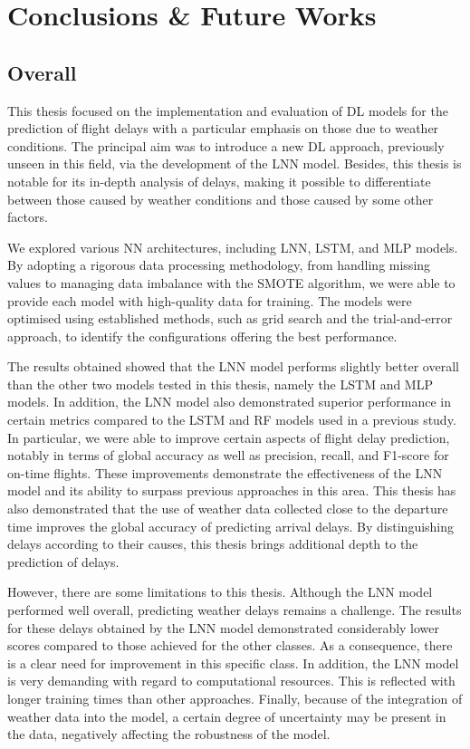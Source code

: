 \documentclass[12pt,oneside]{book} %
\begin{document}
\chapter{Conclusions \& Future Works}

\section{Overall}

\noindent This thesis focused on the implementation and evaluation of DL models for the prediction of flight delays with a particular emphasis on those due to weather conditions. The principal aim was to introduce a new DL approach, previously unseen in this field, via the development of the LNN model. Besides, this thesis is notable for its in-depth analysis of delays, making it possible to differentiate between those caused by weather conditions and those caused by some other factors.

\noindent We explored various NN architectures, including LNN, LSTM, and MLP models. By adopting a rigorous data processing methodology, from handling missing values to managing data imbalance with the SMOTE algorithm, we were able to provide each model with high-quality data for training. The models were optimised using established methods, such as grid search and the trial-and-error approach, to identify the configurations offering the best performance.

\noindent The results obtained showed that the LNN model performs slightly better overall than the other two models tested in this thesis, namely the LSTM and MLP models. In addition, the LNN model also demonstrated superior performance in certain metrics compared to the LSTM and RF models used in a previous study. In particular, we were able to improve certain aspects of flight delay prediction, notably in terms of global accuracy as well as precision, recall, and F1-score for on-time flights. These improvements demonstrate the effectiveness of the LNN model and its ability to surpass previous approaches in this area. This thesis has also demonstrated that the use of weather data collected close to the departure time improves the global accuracy of predicting arrival delays. By distinguishing delays according to their causes, this thesis brings additional depth to the prediction of delays.

\noindent However, there are some limitations to this thesis. Although the LNN model performed well overall, predicting weather delays remains a challenge. The results for these delays obtained by the LNN model demonstrated considerably lower scores compared to those achieved for the other classes. As a consequence, there is a clear need for improvement in this specific class. In addition, the LNN model is very demanding with regard to computational resources. This is reflected with longer training times than other approaches. Finally, because of the integration of weather data into the model, a certain degree of uncertainty may be present in the data, negatively affecting the robustness of the model.
\end{document}
